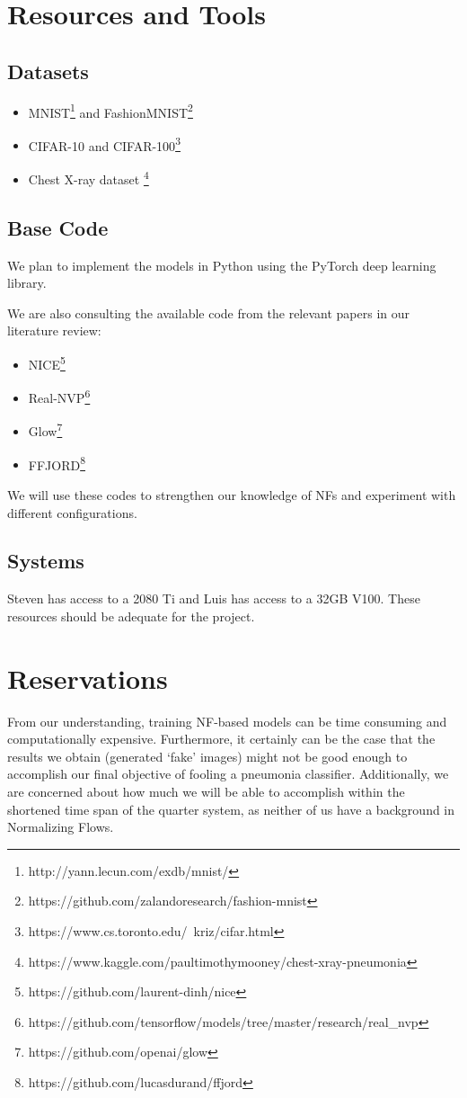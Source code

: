 \documentclass{article}
\begin{document}
\section{Resources and Tools}

\subsection{Datasets} 

\begin{itemize} 
	\item MNIST\footnote{http://yann.lecun.com/exdb/mnist/} and
		FashionMNIST\footnote{https://github.com/zalandoresearch/fashion-mnist} 
	\item CIFAR-10 and CIFAR-100\footnote{https://www.cs.toronto.edu/~kriz/cifar.html}
	\item Chest X-ray dataset
\footnote{https://www.kaggle.com/paultimothymooney/chest-xray-pneumonia}
\end{itemize} 

\subsection{Base Code}

We plan to implement the models in Python using the PyTorch deep learning
library.

We are also consulting the available code from the relevant papers in our
literature review: 
\begin{itemize} 
	\item NICE\footnote{https://github.com/laurent-dinh/nice} 
	\item Real-NVP\footnote{https://github.com/tensorflow/models/tree/master/research/real\_nvp}
	\item Glow\footnote{https://github.com/openai/glow} 
	\item FFJORD\footnote{https://github.com/lucasdurand/ffjord} 
\end{itemize}

We will use these codes to strengthen our knowledge of NFs and experiment with
different configurations. 

\subsection{Systems}
Steven has access to a 2080 Ti and Luis has access to a 32GB V100. These
resources should be adequate for the project.

\section{Reservations} 
From our understanding, training NF-based models can be
time consuming and computationally expensive. Furthermore, it certainly can be
the case that the results we obtain (generated `fake' images) might not be good
enough to accomplish our final objective of fooling a pneumonia classifier.
Additionally, we are concerned about how much we will be able to accomplish
within the shortened time span of the quarter system, as neither of us have a
background in Normalizing Flows. 
\end{document}
